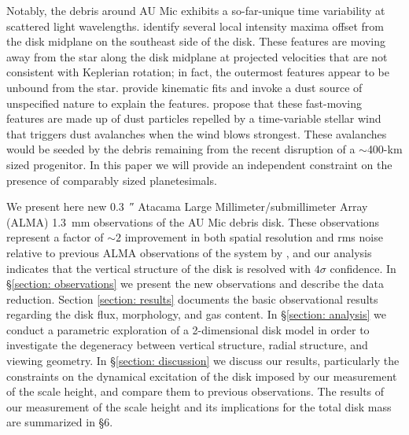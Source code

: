 \documentclass[modern]{aastex62}
\begin{document}
Notably, the debris around AU Mic exhibits a so-far-unique time variability at scattered light wavelengths.
\citet{boccaletti15,boccaletti18} identify several local intensity maxima offset from the disk midplane on the southeast side of the disk. 
These features are moving away from the star along the disk midplane at projected velocities that are not consistent with Keplerian rotation; in fact, the outermost features appear to be unbound from the star. 
\citet{sezestre17} provide kinematic fits and invoke a dust source of unspecified nature to explain the features.
\citet{chiang&fung17} propose that these fast-moving features are made up of dust particles repelled by a time-variable stellar wind that triggers dust avalanches when the wind blows strongest. 
These avalanches would be seeded by the debris remaining from the recent disruption of a $\sim$400-km sized progenitor. 
In this paper we will provide an independent constraint on the presence of comparably sized planetesimals.

We present here new \SI{0.3}{\arcsecond} Atacama Large Millimeter/submillimeter Array \newline (ALMA) \SI{1.3}{mm} observations of the AU Mic debris disk. 
These observations represent a factor of $\sim 2$ improvement in both spatial resolution and rms noise relative to previous ALMA observations of the system by \citet{macgregor13}, and our analysis indicates that the vertical structure of the disk is resolved with $4 \sigma$ confidence.
In \S \ref{section: observations} we present the new observations and describe the data reduction.  
Section \ref{section: results} documents the basic observational results regarding the disk flux, morphology, and gas content.  
In \S \ref{section: analysis} we conduct a parametric exploration of a 2-dimensional disk model in order to investigate the degeneracy between vertical structure, radial structure, and viewing geometry.
In \S \ref{section: discussion} we discuss our results, particularly the constraints on the dynamical excitation of the disk imposed by our measurement of the scale height, and compare them to previous observations.
The results of our measurement of the scale height and its implications for the total disk mass are summarized in \S 6.
\end{document}
